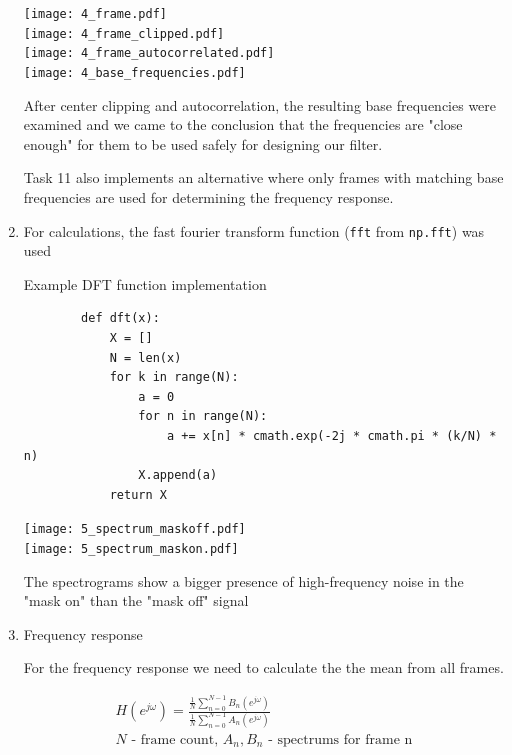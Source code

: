\documentclass[a4paper, 11pt]{article}
\begin{document}
\begin{enumerate}
        \newpage
        \texttt{[image: 4\_frame.pdf]} \\
        \texttt{[image: 4\_frame\_clipped.pdf]} \\
        \texttt{[image: 4\_frame\_autocorrelated.pdf]} \\
        \texttt{[image: 4\_base\_frequencies.pdf]}

        After center clipping and autocorrelation, the resulting base frequencies were examined
        and we came to the conclusion that the frequencies are "close enough"
        for them to be used safely for designing our filter.

        Task 11 also implements an alternative where only frames with matching base frequencies are used for
        determining the frequency response.

        \newpage
        \item
        For calculations, the fast fourier transform function (\texttt{fft} from \texttt{np.fft}) was used

        Example DFT function implementation

        \begin{verbatim}
        def dft(x):
            X = []
            N = len(x)
            for k in range(N):
                a = 0
                for n in range(N):
                    a += x[n] * cmath.exp(-2j * cmath.pi * (k/N) * n)
                X.append(a)
            return X
        \end{verbatim}

        \texttt{[image: 5\_spectrum\_maskoff.pdf]} \\
        \texttt{[image: 5\_spectrum\_maskon.pdf]}

        The spectrograms show a bigger presence of high-frequency noise in the "mask on" than the "mask off" signal

        \newpage
        \item
        Frequency response

        For the frequency response we need to calculate the the mean from all frames.

        \begin{gather*}
            H(e^{j\omega}) = \frac{ \frac{1}{N} \sum\limits_{n=0}^{N-1} B_n(e^{j\omega}) }{ \frac{1}{N} \sum\limits_{n=0}^{N-1} A_n(e^{j\omega}) } \\
            N \text{ - frame count, } A_n, B_n \text{ - spectrums for frame n}
        \end{gather*}


\end{enumerate}
\end{document}
